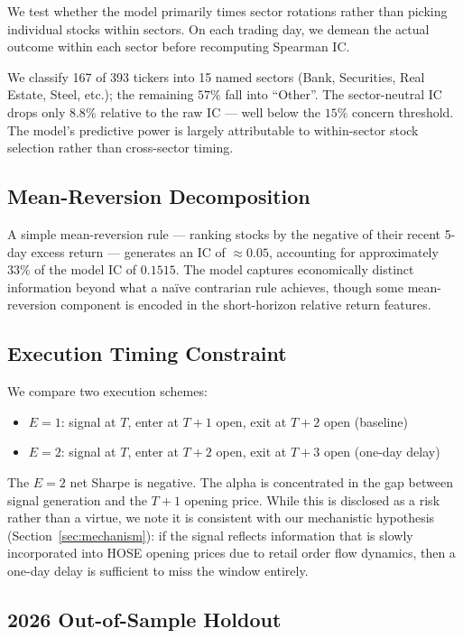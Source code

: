 \documentclass[12pt,a4paper]{article}
\begin{document}
We test whether the model primarily times sector rotations rather than picking
individual stocks within sectors. On each trading day, we demean the actual
outcome within each sector before recomputing Spearman IC.

We classify 167 of 393 tickers into 15 named sectors (Bank, Securities, Real
Estate, Steel, etc.); the remaining $57\%$ fall into ``Other''.
The sector-neutral IC drops only $8.8\%$ relative to the raw IC --- well below
the $15\%$ concern threshold. The model's predictive power is largely attributable
to within-sector stock selection rather than cross-sector timing.

\subsection{Mean-Reversion Decomposition}
\label{sec:mr}

A simple mean-reversion rule --- ranking stocks by the negative of their recent
5-day excess return --- generates an IC of $\approx 0.05$, accounting for
approximately $33\%$ of the model IC of $0.1515$. The model captures economically
distinct information beyond what a na\"ive contrarian rule achieves, though some
mean-reversion component is encoded in the short-horizon relative return features.

\subsection{Execution Timing Constraint}
\label{sec:execution}

We compare two execution schemes:
\begin{itemize}
  \item $E=1$: signal at $T$, enter at $T+1$ open, exit at $T+2$ open (baseline)
  \item $E=2$: signal at $T$, enter at $T+2$ open, exit at $T+3$ open (one-day delay)
\end{itemize}

The $E=2$ net Sharpe is negative. The alpha is concentrated in the gap between
signal generation and the $T+1$ opening price. While this is disclosed as a risk
rather than a virtue, we note it is consistent with our mechanistic hypothesis
(Section~\ref{sec:mechanism}): if the signal reflects information that is slowly
incorporated into HOSE opening prices due to retail order flow dynamics, then
a one-day delay is sufficient to miss the window entirely.

\subsection{2026 Out-of-Sample Holdout}
\label{sec:holdout}
\end{document}
